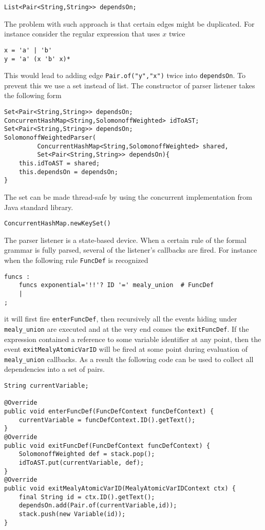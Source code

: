 \begin{lstlisting}
List<Pair<String,String>> dependsOn;
\end{lstlisting}     
The problem with such approach is that certain edges might be duplicated. For instance consider the regular expression that uses $x$ twice
\begin{lstlisting}
x = 'a' | 'b'
y = 'a' (x 'b' x)*
\end{lstlisting}
This would lead to adding edge \texttt{Pair.of("y","x")} twice into \texttt{dependsOn}. To prevent this we use a set instead of list. The constructor of parser listener takes the following form
\begin{lstlisting}
Set<Pair<String,String>> dependsOn;
ConcurrentHashMap<String,SolomonoffWeighted> idToAST;
Set<Pair<String,String>> dependsOn;
SolomonoffWeightedParser(
         ConcurrentHashMap<String,SolomonoffWeighted> shared,
         Set<Pair<String,String>> dependsOn){
    this.idToAST = shared;
    this.dependsOn = dependsOn;
}
\end{lstlisting}
The set can be made thread-safe by using the concurrent implementation from Java standard library.
\begin{lstlisting}
ConcurrentHashMap.newKeySet()
\end{lstlisting}
The parser listener is a state-based device. When a certain rule of the formal grammar is fully parsed, several of the listener's callbacks are fired. For instance when the following rule \texttt{FuncDef} is recognized
\begin{lstlisting}
funcs :
    funcs exponential='!!'? ID '=' mealy_union  # FuncDef
    | 
;
\end{lstlisting} 
it will first fire \texttt{enterFuncDef}, then recursively all the events hiding under \texttt{mealy\_union} are executed and at the very end comes the \texttt{exitFuncDef}. If the expression contained a reference to some variable identifier at any point, then the event \texttt{exitMealyAtomicVarID} will be fired at some point during evaluation of \texttt{mealy\_union} callbacks. As a result the following code can be used to collect all dependencies into a set of pairs.
\begin{lstlisting}
String currentVariable;

@Override
public void enterFuncDef(FuncDefContext funcDefContext) {
    currentVariable = funcDefContext.ID().getText();
}
@Override
public void exitFuncDef(FuncDefContext funcDefContext) {
    SolomonoffWeighted def = stack.pop();
    idToAST.put(currentVariable, def);
}
@Override
public void exitMealyAtomicVarID(MealyAtomicVarIDContext ctx) {
    final String id = ctx.ID().getText();
    dependsOn.add(Pair.of(currentVariable,id));
    stack.push(new Variable(id));
}
\end{lstlisting}
